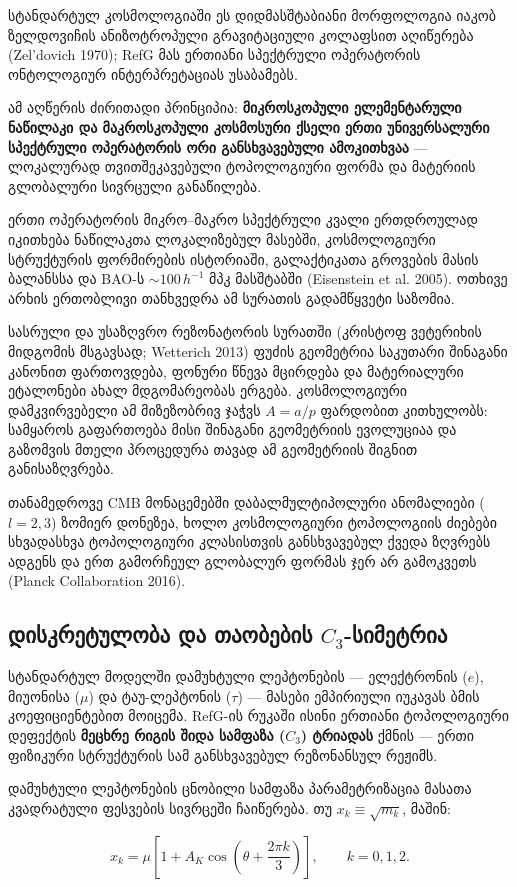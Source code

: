 \documentclass[11pt,a4paper]{article}
\begin{document}
სტანდარტულ კოსმოლოგიაში ეს დიდმასშტაბიანი მორფოლოგია იაკობ ზელდოვიჩის ანიზოტროპული გრავიტაციული კოლაფსით აღიწერება (Zel'dovich 1970); RefG მას ერთიანი სპექტრული ოპერატორის ონტოლოგიურ ინტერპრეტაციას უსაბამებს.

ამ აღწერის ძირითადი პრინციპია: \textbf{მიკროსკოპული ელემენტარული ნაწილაკი და მაკროსკოპული კოსმოსური ქსელი ერთი უნივერსალური სპექტრული ოპერატორის ორი განსხვავებული ამოკითხვაა} — ლოკალურად თვითშეკავებული ტოპოლოგიური ფორმა და მატერიის გლობალური სივრცული განაწილება.

ერთი ოპერატორის მიკრო–მაკრო სპექტრული კვალი ერთდროულად იკითხება ნაწილაკთა ლოკალიზებულ მასებში, კოსმოლოგიური სტრუქტურის ფორმირების ისტორიაში, გალაქტიკათა გროვების მასის ბალანსსა და BAO-ს $\sim100\,h^{-1}\text{ მპკ}$ მასშტაბში (Eisenstein et al. 2005). ოთხივე არხის ერთობლივი თანხვედრა ამ სურათის გადამწყვეტი საზომია.

სასრული და უსაზღვრო რეზონატორის სურათში (კრისტოფ ვეტერიხის მიდგომის მსგავსად; Wetterich 2013) ფუძის გეომეტრია საკუთარი შინაგანი კანონით ფართოვდება, ფონური წნევა მცირდება და მატერიალური ეტალონები ახალ მდგომარეობას ერგება. კოსმოლოგიური დამკვირვებელი ამ მიზეზობრივ ჯაჭვს $A=a/p$ ფარდობით კითხულობს: სამყაროს გაფართოება მისი შინაგანი გეომეტრიის ევოლუციაა და გაზომვის მთელი პროცედურა თავად ამ გეომეტრიის შიგნით განისაზღვრება.

თანამედროვე CMB მონაცემებში დაბალმულტიპოლური ანომალიები ($l=2,3$) ზომიერ დონეზეა, ხოლო კოსმოლოგიური ტოპოლოგიის ძიებები სხვადასხვა ტოპოლოგიური კლასისთვის განსხვავებულ ქვედა ზღვრებს ადგენს და ერთ გამორჩეულ გლობალურ ფორმას ჯერ არ გამოკვეთს (Planck Collaboration 2016).


\subsection{დისკრეტულობა და თაობების \texorpdfstring{$C_3$}{C3}-სიმეტრია}

სტანდარტულ მოდელში დამუხტული ლეპტონების — ელექტრონის ($e$), მიუონისა ($\mu$) და ტაუ-ლეპტონის ($\tau$) — მასები ემპირიული იუკავას ბმის კოეფიციენტებით მოიცემა. RefG-ის რუკაში ისინი ერთიანი ტოპოლოგიური დეფექტის \textbf{მეცხრე რიგის შიდა სამფაზა ($C_3$) ტრიადას} ქმნის — ერთი ფიზიკური სტრუქტურის სამ განსხვავებულ რეზონანსულ რეჟიმს.

დამუხტული ლეპტონების ცნობილი სამფაზა პარამეტრიზაცია მასათა კვადრატული ფესვების სივრცეში ჩაიწერება. თუ $x_k\equiv\sqrt{m_k}$, მაშინ:

\[
x_k = \mu \left[1 + A_K \cos\left(\theta + \frac{2\pi k}{3}\right)\right], \qquad k = 0, 1, 2.
\]
\end{document}
